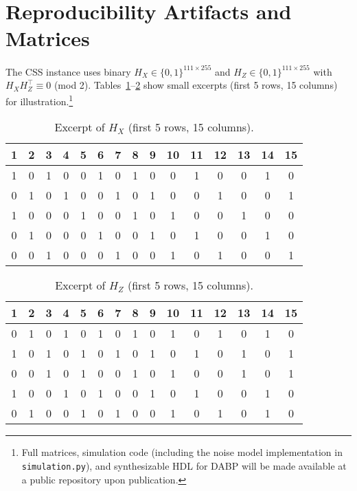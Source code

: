 \documentclass[conference]{IEEEtran}
\begin{document}
\appendix

\section{Reproducibility Artifacts and Matrices}
The CSS instance uses binary \(H_X\in\{0,1\}^{111\times 255}\) and \(H_Z\in\{0,1\}^{111\times 255}\) with \(H_X H_Z^\top\equiv0\) (mod 2). Tables~\ref{tab:Hx-sample}--\ref{tab:Hz-sample} show small excerpts (first 5 rows, 15 columns) for illustration.\footnote{Full matrices, simulation code (including the noise model implementation in \texttt{simulation.py}), and synthesizable HDL for DABP will be made available at a public repository upon publication.}

\begin{table}[h]
\centering
\caption{Excerpt of \(H_X\) (first 5 rows, 15 columns).}
\label{tab:Hx-sample}
\begin{tabular}{ccccccccccccccc}
\toprule
1 & 2 & 3 & 4 & 5 & 6 & 7 & 8 & 9 & 10 & 11 & 12 & 13 & 14 & 15 \\
\midrule
1 & 0 & 1 & 0 & 0 & 1 & 0 & 1 & 0 & 0 & 1 & 0 & 0 & 1 & 0 \\
0 & 1 & 0 & 1 & 0 & 0 & 1 & 0 & 1 & 0 & 0 & 1 & 0 & 0 & 1 \\
1 & 0 & 0 & 0 & 1 & 0 & 0 & 1 & 0 & 1 & 0 & 0 & 1 & 0 & 0 \\
0 & 1 & 0 & 0 & 0 & 1 & 0 & 0 & 1 & 0 & 1 & 0 & 0 & 1 & 0 \\
0 & 0 & 1 & 0 & 0 & 0 & 1 & 0 & 0 & 1 & 0 & 1 & 0 & 0 & 1 \\
\bottomrule
\end{tabular}
\end{table}

\begin{table}[h]
\centering
\caption{Excerpt of \(H_Z\) (first 5 rows, 15 columns).}
\label{tab:Hz-sample}
\begin{tabular}{ccccccccccccccc}
\toprule
1 & 2 & 3 & 4 & 5 & 6 & 7 & 8 & 9 & 10 & 11 & 12 & 13 & 14 & 15 \\
\midrule
0 & 1 & 0 & 1 & 0 & 1 & 0 & 1 & 0 & 1 & 0 & 1 & 0 & 1 & 0 \\
1 & 0 & 1 & 0 & 1 & 0 & 1 & 0 & 1 & 0 & 1 & 0 & 1 & 0 & 1 \\
0 & 0 & 1 & 0 & 1 & 0 & 0 & 1 & 0 & 1 & 0 & 0 & 1 & 0 & 1 \\
1 & 0 & 0 & 1 & 0 & 1 & 0 & 0 & 1 & 0 & 1 & 0 & 0 & 1 & 0 \\
0 & 1 & 0 & 0 & 1 & 0 & 1 & 0 & 0 & 1 & 0 & 1 & 0 & 1 & 0 \\
\bottomrule
\end{tabular}
\end{table}



\end{document}
